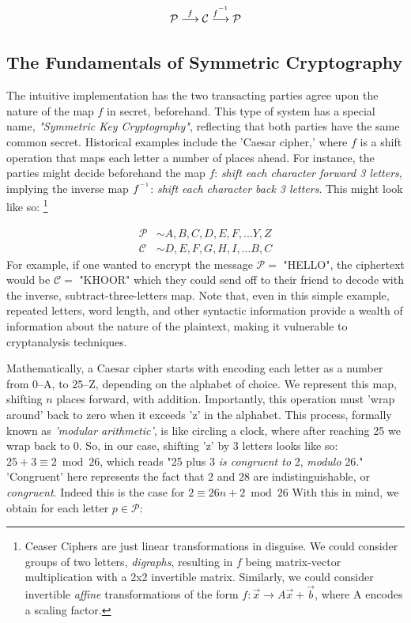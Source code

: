 \documentclass[11pt, a4paper]{report}
\newcommand{\inv}{^{\raisebox{.2em}{$\scriptscriptstyle-1$}}}
\begin{document}
$$ \mathcal{P} \overset{f}\longrightarrow \mathcal{C} \overset{f\inv}\longrightarrow \mathcal{P} $$

\subsection{The Fundamentals of Symmetric Cryptography}

The intuitive implementation has the two transacting parties agree upon the nature of the map $f$ in secret, beforehand. This type of system has a special name, \textit{"Symmetric Key Cryptography"}, reflecting that both parties have the same common secret. Historical examples include the 'Caesar cipher,' where $f$ is a shift operation that maps each letter a number of places ahead. For instance, the parties might decide beforehand the map $f$: \textit{shift each character forward 3 letters}, implying the inverse map $f\inv$: \textit{shift each character back 3 letters}. This might look like so: \footnote{Ceaser Ciphers are just linear transformations in disguise. We could consider groups of two letters, \textit{digraphs}, resulting in $f$ being matrix-vector multiplication with a 2x2 invertible matrix. Similarly, we could consider invertible \textit{affine} transformations of the form $f:\vec{x} \to A\vec{x} + \vec{b}$, where A encodes a scaling factor.}

\begin{align*}
 \mathcal{P} &\sim A,B,C,D,E,F,...Y,Z  \\ 
 \mathcal{C} &\sim D,E,F,G,H,I,...B,C 
\end{align*} %
For example, if one wanted to encrypt the message $\mathcal{P} =$ "HELLO", the ciphertext would be $\mathcal{C} =$ "KHOOR" which they could send off to their friend to decode with the inverse, subtract-three-letters map. Note that, even in this simple example, repeated letters, word length, and other syntactic information provide a wealth of information about the nature of the plaintext, making it vulnerable to cryptanalysis techniques.\autocite[56]{koblitz} 

Mathematically, a Caesar cipher starts with encoding each letter as a number from $0$–A, to $25$–Z, depending on the alphabet of choice. We represent this map, shifting $n$ places forward, with addition. Importantly, this operation must 'wrap around' back to zero when it exceeds 'z' in the alphabet. This process, formally known as \textit{'modular arithmetic'}, is like circling a clock, where after reaching 25 we wrap back to 0. So, in our case, shifting 'z' by 3 letters looks like so: $25 + 3 \equiv 2 \bmod 26$, which reads "25 plus 3 \textit{is congruent to} 2, \textit{modulo} 26." 'Congruent' here represents the fact that $2$ and $28$ are indistinguishable, or \textit{congruent}. Indeed this is the case for $2 \equiv 26n+2 \bmod 26$ With this in mind, we obtain for each letter $p \in \mathcal{P}$:  
\end{document}
